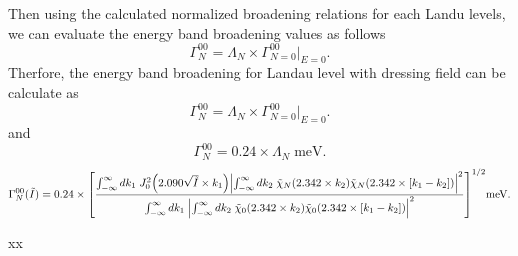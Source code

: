 \noindent
Then using the calculated normalized broadening relations for each Landu levels, we can evaluate the energy band broadening values as follows
\begin{equation} \label{5.31}
  \Gamma^{00}_{N} = \Lambda_N \times \Gamma^{00}_{N=0}\big|_{E=0}.
\end{equation}
Therfore, the energy band broadening for Landau level with dressing field can be calculate as
\begin{equation} \label{5.32}
  \Gamma^{00}_{N} = \Lambda_N \times \Gamma^{00}_{N=0}\big|_{E=0}.
\end{equation}
and
\begin{equation} \label{5.33}
  \Gamma^{00}_{N} = 0.24 \times \Lambda_N  \;\text{meV}.
\end{equation}
\begin{equation} \label{5.34}
  \Gamma^{00}_{N}(\tilde{I}) = 0.24 \times
  \qty[
  \frac
  {\int_{-\infty}^{\infty} d {k}_1 \;
  J_0^2\qty(2.090\sqrt{\tilde{I}}\times{k}_1)
  \qty|
  \int_{-\infty}^{\infty} d{k}_2 \;
  \tilde{\chi}_{N}\qty(2.342 \times k_2)
  \tilde{\chi}_{N}\qty(2.342 \times \qty[{k}_1 - {k}_2])|^2}
  {\int_{-\infty}^{\infty} d {k}_1 \;
  \qty|
  \int_{-\infty}^{\infty} d{k}_2 \;
  \tilde{\chi}_{0}\qty(2.342 \times k_2)
  \tilde{\chi}_{0}\qty(2.342 \times \qty[{k}_1 - {k}_2])|^2}
  ]^{1/2} \text{meV}.
\end{equation}






























xx
